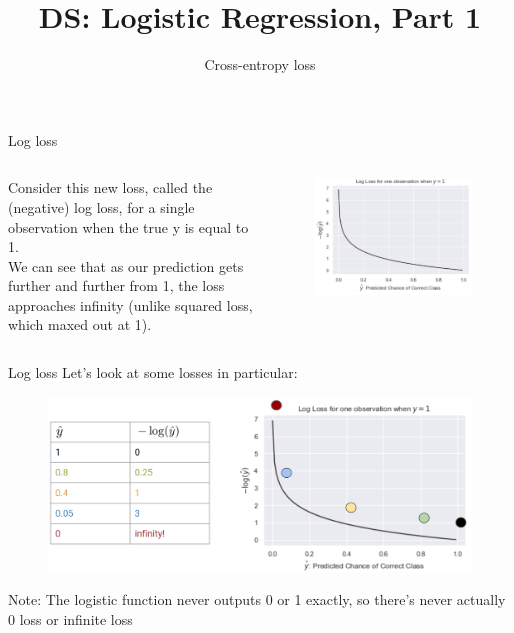\documentclass[aspectratio=169]{../latex_main/tntbeamer}  %
\title[Introduction]{DS: Logistic Regression, Part 1}
\subtitle{Cross-entropy loss}
\begin{document}
	
	\maketitle
	\begin{frame}{Log loss}
	    \begin{columns}
	        \begin{column}{.4\textwidth}
	                Consider this new loss, called the (negative) log loss, for a single observation when the true y is equal to 1.\\
	                \bigskip
	                We can see that as our prediction gets further and further from 1, the loss approaches infinity (unlike squared loss, which maxed out at 1).
	        \end{column}
	        
	        \begin{column}{.4\textwidth}
	                \begin{figure}
	                    \centering
	                    \includegraphics[scale=.5]{Bild18}
	                \end{figure}
	        \end{column}
	    \end{columns}
	\end{frame}
	
	
	
	\begin{frame}{Log loss}
	    Let’s look at some losses in particular:
        \begin{figure}
            \centering
            \includegraphics[scale=.33]{Bild19}
        \end{figure}
	    Note: The logistic function never outputs 0 or 1 exactly, so there’s never actually 0 loss or infinite loss
	\end{frame}
	
\end{document}

